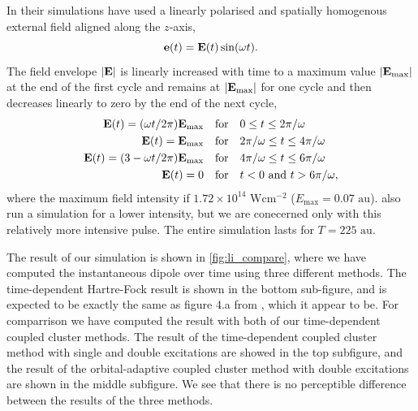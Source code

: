 In their simulations \citeauthor{li2005time} have used a linearly polarised and 
spatially homogenous external field aligned along the $z$-axis, 
\begin{equation}
    \vb{e}(t) = \vb{E}(t)\sin(\omega t).
\end{equation}
The field envelope $|\vb{E}|$ is linearly increased with time to a maximum value 
$|\vb{E}_\text{max}|$ at the end of the first cycle and remains at $|\vb{E}_\text{max}|$
for one cycle and then decreases linearly to zero by the end of the next cycle,
\begin{equation}
    \label{eq:li_laser}
    \begin{aligned}
        \vb{E}(t) = (\omega t / 2\pi) \vb{E}_\text{max} \quad &\text{for} \quad
            0 \leq t \leq 2\pi / \omega \\ 
        \vb{E}(t) = \vb{E}_\text{max} \quad &\text{for} \quad 
            2\pi / \omega \leq t \leq 4\pi / \omega \\ 
        \vb{E}(t) = (3 - \omega t / 2\pi) \vb{E}_\text{max} \quad &\text{for} \quad 
            4\pi / \omega \leq t \leq 6\pi / \omega \\
        \vb{E}(t) = 0 \quad &\text{for} \quad
            t < 0 \text{ and } t > 6\pi / \omega,
    \end{aligned}
\end{equation}
where the maximum field intensity if $1.72\times10^{14} \text{ W} \text{cm}^{-2}$ 
($E_\text{max} = 0.07 \text{ au}$). \citeauthor{li2005time} also run a simulation 
for a lower intensity, but we are conecerned only with this relatively more intensive 
pulse. The entire simulation lasts for $T=225 \text{ au}$.

The result of our simulation is shown in \autoref{fig:li_compare}, where we have 
computed the instantaneous dipole over time using three different methods. The 
time-dependent Hartre-Fock result is shown in the bottom sub-figure, and is expected 
to be exactly the same as figure 4.a from \citeauthor{li2005time}\cite{li2005time},
which it appear to be. For comparrison we have computed the result with both of 
our time-dependent coupled cluster methods. The result of the time-dependent 
coupled cluster method with single and double excitations are showed in the top subfigure,
and the result of the orbital-adaptive coupled cluster method with double excitations 
are shown in the middle subfigure. We see that there is no perceptible difference between 
the results of the three methods.

